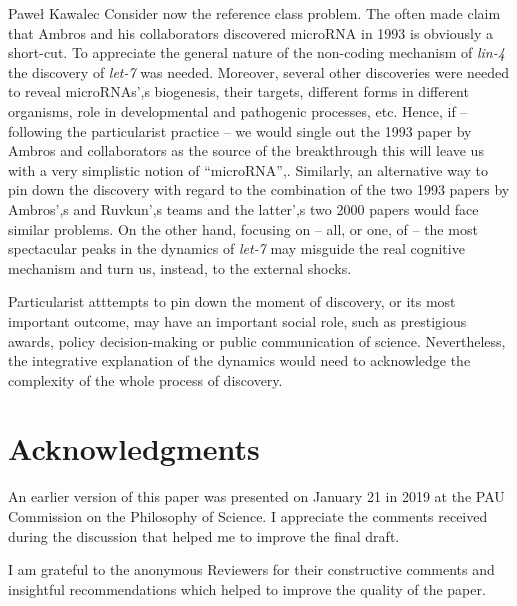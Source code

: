 \begin{artengenv}{Paweł Kawalec}
Consider now the reference class problem. The often made claim that Ambros and his collaborators discovered microRNA in 1993 is obviously a short-cut. To appreciate the general nature of the non-coding mechanism of \textit{lin-4} the discovery of \textit{let-7} was needed. Moreover, several other discoveries were needed to reveal microRNAs',s biogenesis, their targets, different forms in different organisms, role in developmental and pathogenic processes, etc. Hence, if -- following the particularist practice -- we would single out the 1993 paper by Ambros and collaborators as the source of the breakthrough this will leave us with a very simplistic notion of ``microRNA'',. Similarly, an alternative way to pin down the discovery with regard to the combination of the two 1993 papers by Ambros',s and Ruvkun',s teams and the latter',s two 2000 papers would face similar problems. On the other hand, focusing on -- all, or one, of -- the most spectacular peaks in the dynamics of \textit{let-7} may misguide the real cognitive mechanism and turn us, instead, to the external shocks.

Particularist atttempts to pin down the moment of discovery, or its most important outcome, may have an important social role, such as prestigious awards, policy decision-making or public communication of science. Nevertheless, the integrative explanation of the dynamics would need to acknowledge the complexity of the whole process of discovery.

\section{Acknowledgments }
An earlier version of this paper was presented on January 21 in 2019 at the PAU Commission on the Philosophy of Science. I appreciate the comments received during the discussion that helped me to improve the final draft.

I am grateful to the anonymous Reviewers for their constructive comments and insightful recommendations which helped to improve the quality of the paper.

\end{artengenv}